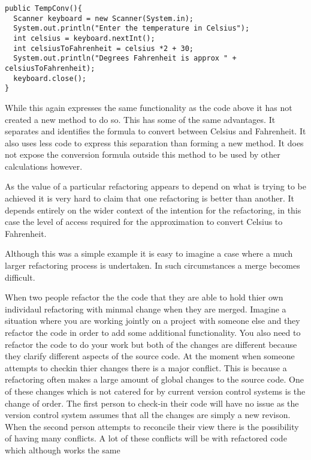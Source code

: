 \begin{verbatim}
public TempConv(){
  Scanner keyboard = new Scanner(System.in);
  System.out.println("Enter the temperature in Celsius");
  int celsius = keyboard.nextInt();
  int celsiusToFahrenheit = celsius *2 + 30;
  System.out.println("Degrees Fahrenheit is approx " + celsiusToFahrenheit);
  keyboard.close();
}
\end{verbatim}

While this again expresses the same functionality as the code above it has not created a new method to do so. This has some of the same advantages. It separates and identifies the formula to convert between Celsius and Fahrenheit. It also uses less code to express this separation than forming a new method. It does not expose the conversion formula outside this method to be used by other calculations however.

As the value of a particular refactoring appears to depend on what is trying to be achieved it is very hard to claim that one refactoring is better than another. It depends entirely on the wider context of the intention for the refactoring, in this case the level of access required for the approximation to convert Celsius to Fahrenheit.

Although this was a simple example it is easy to imagine a case where a much larger refactoring process is undertaken. In such circumstances a merge becomes difficult. 


When two people refactor the the code that they are able to hold thier own individaul refactoring with minmal change when they are merged.
Imagine  a situation where you are working jointly on a project with someone else and they refactor the code in order to add some additional functionality.  You also need to refactor the code to do your work but both of the changes are different because they clarify different aspects of the source code.  At the moment when someone attempts to checkin thier changes there is a major conflict.  This is because a refactoring often makes a large amount of global changes to the source code.  One of these changes which is not catered for by current version control systems is the change of order.  The first person to check-in their code will have no issue as the version control system assumes that all the changes are simply a new revison.  When the second person attempts to reconcile their view there is the possibility of having many conflicts.  A lot of these conflicts will be with refactored code which although works the same 

